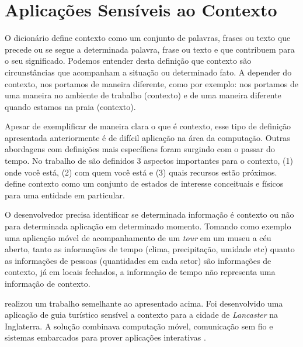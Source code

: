 
\section{Aplicações Sensíveis ao Contexto}\label{sec:contexto}

O dicionário  define contexto como um conjunto de palavras, frases ou
texto que precede ou se segue a determinada palavra, frase ou texto e que
contribuem para o seu significado. Podemos entender desta definição que contexto
são circunstâncias que acompanham a situação ou determinado fato. A depender do
contexto, nos portamos de maneira diferente, como por exemplo: nos portamos de
uma maneira no ambiente de trabalho (contexto) e de uma maneira diferente quando
estamos na praia (contexto).


Apesar de exemplificar de maneira clara o que é contexto, esse tipo de definição
apresentada anteriormente é de difícil aplicação na área da computação.
Outras abordagens com definições mais específicas foram surgindo com o
passar do tempo. No trabalho de  são definidos 3 aspectos
importantes para o contexto, (1) onde você está, (2) com quem você está e (3)
quais recursos estão próximos.  define contexto 
como um conjunto de estados de interesse conceituais e físicos para uma entidade 
em particular.

O desenvolvedor precisa identificar se determinada informação é contexto ou não
para determinada aplicação em determinado momento. Tomando como exemplo uma
aplicação móvel de acompanhamento de um \textit{tour} em um museu a céu aberto, 
tanto as informações de tempo (clima, precipitação, umidade etc) quanto as 
informações de pessoas (quantidades em cada setor) são informações de contexto, 
já em locais fechados, a informação de tempo não representa uma informação de 
contexto.

 realizou um trabalho semelhante ao apresentado
acima. Foi desenvolvido uma aplicação de guia turístico sensível a contexto
para a cidade de \textit{Lancaster} na Inglaterra. A solução combinava
computação móvel, comunicação sem fio e sistemas embarcados para prover
aplicações interativas \cite{davies1999caches}.

